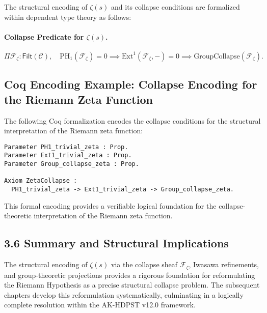 \documentclass[11pt]{article}
\begin{document}
The structural encoding of $\zeta(s)$ and its collapse conditions are formalized within dependent type theory as follows:

\paragraph{Collapse Predicate for $\zeta(s)$.}
\[
\Pi \mathcal{F}_{\zeta} : \mathsf{Filt}(\mathcal{C}), \quad \mathrm{PH}_1(\mathcal{F}_{\zeta}) = 0 \implies \mathrm{Ext}^1(\mathcal{F}_{\zeta}, -) = 0 \implies \mathrm{GroupCollapse}(\mathcal{F}_{\zeta}).
\]

\subsection*{Coq Encoding Example: Collapse Encoding for the Riemann Zeta Function}

The following Coq formalization encodes the collapse conditions for the structural interpretation of the Riemann zeta function:

\begin{lstlisting}[language=Coq, caption=Collapse Encoding for the Riemann Zeta Function, captionpos=b]
Parameter PH1_trivial_zeta : Prop.
Parameter Ext1_trivial_zeta : Prop.
Parameter Group_collapse_zeta : Prop.

Axiom ZetaCollapse :
  PH1_trivial_zeta -> Ext1_trivial_zeta -> Group_collapse_zeta.
\end{lstlisting}


This formal encoding provides a verifiable logical foundation for the collapse-theoretic interpretation of the Riemann zeta function.

\subsection*{3.6 Summary and Structural Implications}

The structural encoding of $\zeta(s)$ via the collapse sheaf $\mathcal{F}_{\zeta}$, Iwasawa refinements, and group-theoretic projections provides a rigorous foundation for reformulating the Riemann Hypothesis as a precise structural collapse problem. The subsequent chapters develop this reformulation systematically, culminating in a logically complete resolution within the AK-HDPST v12.0 framework.



\end{document}
